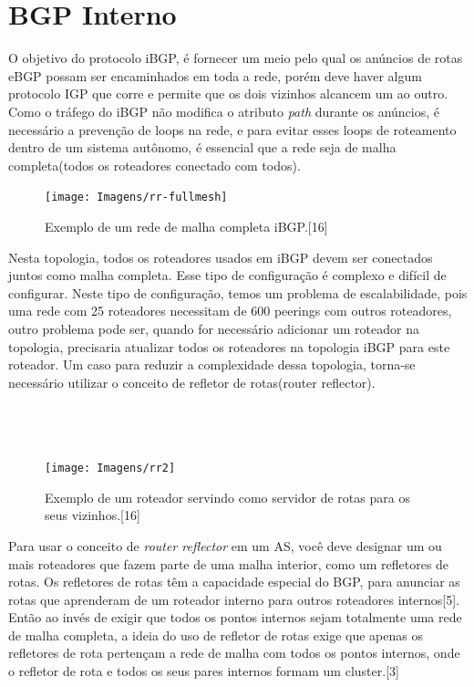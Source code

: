 \documentclass[12pt,a4paper]{report}
\begin{document}
\section{BGP Interno}
O objetivo do protocolo iBGP, \'e fornecer um meio pelo qual os an\'uncios de rotas eBGP possam ser encaminhados em toda a rede, por\'em deve haver algum protocolo IGP que corre e permite que os dois vizinhos alcancem um ao outro. Como o tr\'afego do iBGP n\~ao modifica o atributo \textit{path} durante os an\'uncios, \'e necess\'ario a preven\c{c}\~ao de loops na rede, e para evitar esses loops de roteamento dentro de um sistema aut\^onomo, \'e essencial que a rede seja de malha completa(todos os roteadores conectado com todos).

\begin{figure}[!htb]
 \centering
 \texttt{[image: Imagens/rr-fullmesh]}
  \caption{\label{fig:rr-fullmesh} Exemplo de um rede de malha completa iBGP.[16]}
\end{figure}

Nesta topologia, todos os roteadores usados em iBGP devem ser conectados juntos como malha completa. Esse tipo de configura\c{c}\~ao \'e complexo e dif\'icil de configurar. Neste tipo de configura\c{c}\~ao, temos um problema de escalabilidade, pois uma rede com 25 roteadores necessitam de 600 peerings com outros roteadores, outro problema pode ser, quando for necess\'ario adicionar um roteador na topologia, precisaria atualizar todos os roteadores na topologia iBGP para este roteador. Um caso para reduzir a complexidade dessa topologia, torna-se necess\'ario utilizar o conceito de refletor de rotas(router reflector).
\\
\\
\\
\\
\begin{figure}[!htb]
 \centering
 \texttt{[image: Imagens/rr2]}
  \caption{\label{fig:rr2} Exemplo de um roteador servindo como servidor de rotas para os seus vizinhos.[16]}
\end{figure}

Para usar o conceito de \textit{router reflector} em um AS, voc\^e deve designar um ou mais roteadores que fazem parte de uma malha interior, como um refletores de rotas. Os refletores de rotas t\^em a capacidade especial do BGP, para anunciar as rotas que aprenderam de um roteador interno para outros roteadores internos[5]. Ent\~ao ao inv\'es de exigir que todos os pontos internos sejam totalmente uma rede de malha completa, a ideia do uso de refletor de rotas exige que apenas os refletores de rota pertençam a rede de malha com todos os pontos internos, onde o refletor de rota e todos os seus pares internos formam um cluster.[3]
\end{document}
